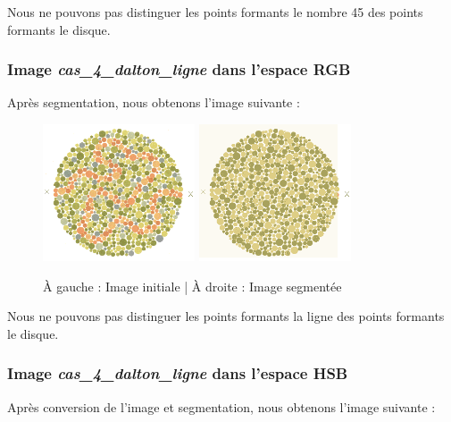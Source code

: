 \documentclass[a4paper]{article}
\begin{document}
Nous ne pouvons pas distinguer les points formants le nombre 45 des points formants le disque.

\clearpage
\subsubsection{Image {\em cas\_4\_dalton\_ligne} dans l'espace RGB}

Après segmentation, nous obtenons l'image suivante :

\begin{figure}[H]
\begin{center}
\includegraphics[width=170px]{../base/cas_4_dalton_ligne.png}
\includegraphics[width=170px]{../resultats/cas_4_dalton_ligne_seg.png}
\end{center}
\caption{À gauche : Image initiale | À droite : Image segmentée}
\end{figure}

Nous ne pouvons pas distinguer les points formants la ligne des points formants le disque.

\subsubsection{Image {\em cas\_4\_dalton\_ligne} dans l'espace HSB}

Après conversion de l'image et segmentation, nous obtenons l'image suivante :
\end{document}
